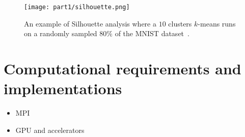 	\begin{figure}[!h]
		\centering
		\texttt{[image: part1/silhouette.png]}
		\caption{An example of Silhouette analysis where a $10$ clusters $k$-means runs on a randomly sampled $80\%$ of the MNIST dataset~\cite{lecun2010mnist}.} \label{fig:silhouette}
	\end{figure}


\section{Computational requirements and implementations} \label{sec:implementation}
\begin{itemize}
  \item MPI
  \item GPU and accelerators
\end{itemize}

